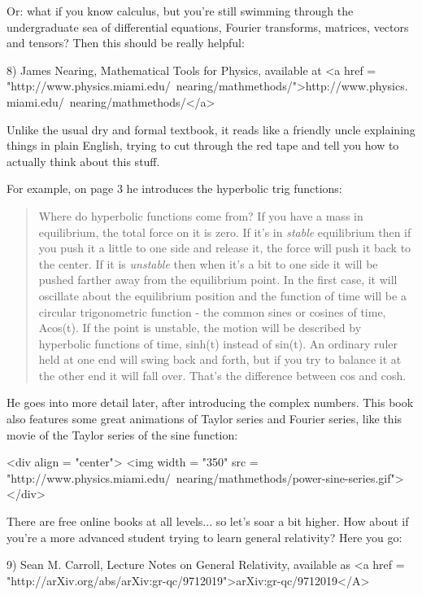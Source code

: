 Or: what if you know calculus, but you're still swimming through the
undergraduate sea of differential equations, Fourier transforms, 
matrices, vectors and tensors?  Then this should be really helpful:

8) James Nearing, Mathematical Tools for Physics, available at
<a href = "http://www.physics.miami.edu/~nearing/mathmethods/">http://www.physics.miami.edu/~nearing/mathmethods/</a>

Unlike the usual dry and formal textbook, it reads like a friendly 
uncle explaining things in plain English, trying to cut through the red
tape and tell you how to actually think about this stuff.

For example, on page 3 he introduces the hyperbolic trig functions:

\begin{quote}
  Where do hyperbolic functions come from?  If you have a mass in
  equilibrium, the total force on it is zero.  If it's in
  \emph{stable} equilibrium then if you push it a little to one side
  and release it, the force will push it back to the center.  If it is
  \emph{unstable} then when it's a bit to one side it will be pushed
  farther away from the equilibrium point.  In the first case, it will
  oscillate about the equilibrium position and the function of time
  will be a circular trigonometric function - the common sines or
  cosines of time, Acos(\omega t).  If the point is unstable, the
  motion will be described by hyperbolic functions of time,
  sinh(\omega t) instead of sin(\omega t).  An ordinary ruler held at
  one end will swing back and forth, but if you try to balance it at
  the other end it will fall over.  That's the difference between cos
  and cosh.  
\end{quote}

He goes into more detail later, after introducing the complex numbers.
This book also features some great animations of Taylor series and 
Fourier series, like this movie of the Taylor series of the sine
function:

<div align = "center">
<img width = "350" src = "http://www.physics.miami.edu/~nearing/mathmethods/power-sine-series.gif">
</div>

There are free online books at all levels... so let's soar a bit 
higher.  How about if you're a more advanced student trying to learn 
general relativity?  Here you go:

9) Sean M. Carroll, Lecture Notes on General Relativity, available as
 <a href = "http://arXiv.org/abs/arXiv:gr-qc/9712019">arXiv:gr-qc/9712019</A>

